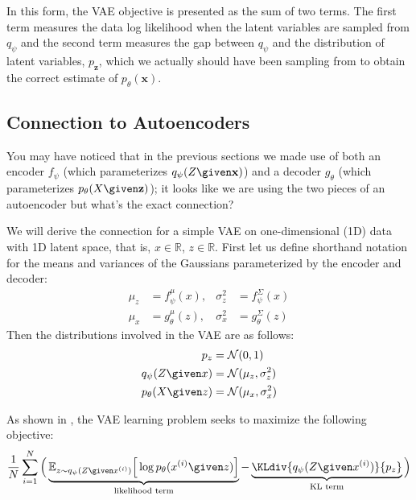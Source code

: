 In this form, the VAE objective is presented as the sum of two terms. The first term measures the data log likelihood when the latent variables are sampled from $q_{\psi}$ and the second term measures the gap between $q_{\psi}$ and the distribution of latent variables, $p_{\mathbf{z}}$, which we actually should have been sampling from to obtain the correct estimate of $p_{\theta}(\mathbf{x})$.


\subsection{Connection to Autoencoders}
You may have noticed that in the previous sections we made use of both an encoder $f_{\psi}$ (which parameterizes $q_{\psi}(Z \given \mathbf{x})$) and a decoder $g_{\theta}$ (which parameterizes $p_{\theta}(X \given \mathbf{z})$); it looks like we are using the two pieces of an autoencoder but what's the exact connection? 

We will derive the connection for a simple VAE on one-dimensional (1D) data with 1D latent space, that is, $x \in \mathbb{R}$, $z \in \mathbb{R}$. First let us define shorthand notation for the means and variances of the Gaussians parameterized by the encoder and decoder:
\begin{align}
    \mu_z &= f^{\mu}_{\psi}(x), & \sigma^2_z &= f^{\Sigma}_{\psi}(x)\\
    \mu_x &= g^{\mu}_{\theta}(z), & \sigma^2_x &= g^{\Sigma}_{\theta}(z)
\end{align}
Then the distributions involved in the VAE are as follows:
\begin{align}
    p_z &= \mathcal{N}(0,1)\\
    q_{\psi}(Z \given x) &= \mathcal{N}(\mu_z, \sigma^2_z)\\
    p_{\theta}(X \given z) &= \mathcal{N}(\mu_x, \sigma^2_x)
\end{align}

As shown in \eqn{\ref{eqn:generative_modeling_meets_representation_learning:vae_objective_form2}}, the VAE learning problem seeks to maximize the following objective:
\begin{align}
    \frac{1}{N}\sum_{i=1}^N \Big( \underbrace{\mathbb{E}_{z\sim q_{\psi}(Z \given x^{(i)})}\Big[ \log p_{\theta}(x^{(i)} \given z) \Big]}_{\text{likelihood term}} - \underbrace{\KLdiv{q_{\psi}(Z \given x^{(i)})}{p_{z}}}_{\text{KL term}} \Big)
\end{align}

